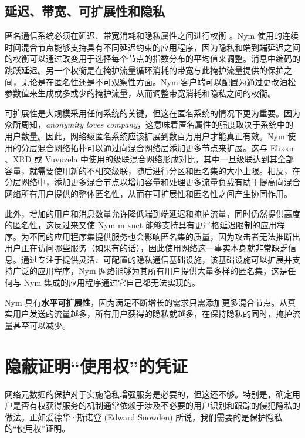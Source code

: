\documentclass{article}
\begin{document}
	\subsection{延迟、带宽、可扩展性和隐私}

	匿名通信系统必须在延迟、带宽消耗和隐私属性之间进行权衡 \cite{ref33}。Nym 使用的连续时间混合节点能够支持具有不同延迟约束的应用程序，因为隐私和端到端延迟之间的权衡可以通过改变用于选择每个节点的指数分布的平均值来调整。消息中编码的跳跃延迟。另一个权衡是在掩护流量循环消耗的带宽与此掩护流量提供的保护之间，无论是在匿名性还是不可观察性方面。Nym 客户端可以配置为通过更改泊松参数值来生成或多或少的掩护流量，从而调整带宽消耗和隐私之间的权衡。\newline

	可扩展性是大规模采用任何系统的关键，但这在匿名系统的情况下更为重要。因为众所周知，\emph{anonymity loves company}\cite{ref41}，这意味着匿名属性的强度取决于系统中的用户数量。因此，网络级匿名系统应该扩展到数百万用户才能真正有效。Nym 使用的分层混合网络拓扑可以通过向混合网络层添加更多节点来扩展。这与 Elixxir \cite{ref16, ref19}、XRD\cite{ref70} 或 Vuvuzela \cite{ref103} 中使用的级联混合网络形成对比，其中一旦级联达到其全部容量，就需要使用新的不相交级联，随后进行分区和匿名集的大小上限。相反，在分层网络中，添加更多混合节点以增加容量和处理更多流量负载有助于提高向混合网络所有用户提供的整体匿名性，从而在可扩展性和匿名性之间产生协同作用。\newline

	此外，增加的用户和消息数量允许降低端到端延迟和掩护流量，同时仍然提供高度的匿名性，这反过来又使 Nym mixnet 能够支持具有更严格延迟限制的应用程序。为不同的应用程序集提供服务也会影响匿名集的质量，因为攻击者无法推断出用户正在访问哪些服务（如果有的话），因此使用网络这一事实本身就非常缺乏信息。通过专注于提供灵活、可配置的隐私通信基础设施，该基础设施可以扩展并支持广泛的应用程序，Nym 网络能够为其所有用户提供大量多样的匿名集，这是任何与 Nym 集成的应用程序通过它自己都无法实现的。\newline

	Nym 具有\textbf{水平可扩展性}，因为满足不断增长的需求只需添加更多混合节点。从真实用户发送的流量越多，所有用户获得的隐私就越多，在保持隐私的同时，掩护流量甚至可以减少。\newline
	
	\section{隐蔽证明“使用权”的凭证}

	网络元数据的保护对于实施隐私增强服务是必要的，但这还不够。特别是，确定用户是否有权获得服务的机制通常依赖于涉及不必要的用户识别和跟踪的侵犯隐私的做法。正如爱德华·斯诺登 (Edward Snowden) 所说，我们需要的是保护隐私的“使用权”证明。
	
\end{document}
